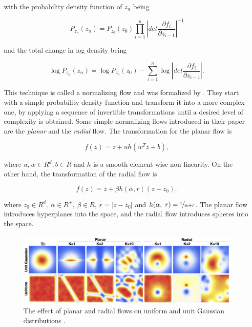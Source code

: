 with the probability density function of $ z_n $ being

\begin{equation}
    \label{equation:cnf:nf:total_change_density}
    P_{z_n}(z_n) = P_{z_0}(z_0) \prod_{i=1}^n \left | det \frac{\partial f_i}{\partial z_{i-1}} \right |^{-1}
\end{equation}

and the total change in log density being

\begin{equation}
    \label{equation:cnf:nf:total_change_log_density}
    \log P_{z_n}(z_n) = \log P_{z_0}(z_0) - \sum_{i=1}^n \log \left | det \frac{\partial f_i}{\partial z_{i-1}} \right |.
\end{equation}

This technique is called a normalizing flow and was formalized by \citet{rezende2015variational}. They start with a simple probability density function and transform it into a more complex one, by applying a sequence of invertible transformations until a desired level of complexity is obtained. Some simple normalizing flows introduced in their paper \citep{rezende2015variational} are the \emph{planar} and the \emph{radial} flow. The transformation for the planar flow is

\begin{displaymath}
    f(z) = z + uh(w^Tz + b),
\end{displaymath}

where $ u, w \in R^d, b \in R $ and $ h $ is a smooth element-wise non-linearity. On the other hand, the transformation of the radial flow is

\begin{displaymath}
    f(z) = z + \beta h(\alpha, r)(z - z_0),
\end{displaymath}

where $ z_0 \in R^d, \ \alpha \in R^+, \ \beta \in R, \ r = \lvert z - z_0 \rvert $ and $ h(\alpha, \ r) = \nicefrac{1}{\alpha + r} $. The planar flow introduces hyperplanes into the space, and the radial flow introduces spheres into the space.

\begin{figure}[ht]
      \centering
      \includegraphics[width=\columnwidth]{figures/planar_radial_flows.png}
      \caption{The effect of planar and radial flows on uniform and unit Gaussian distributions \citep{rezende2015variational}.}
      \label{figure:cnf:planar_radial_flows}
\end{figure}

